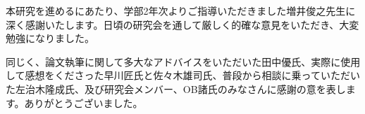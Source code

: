 \begin{acknowledgment}
  本研究を進めるにあたり、学部2年次よりご指導いただきました増井俊之先生に深く感謝いたします。日頃の研究会を通して厳しく的確な意見をいただき、大変勉強になりました。
  
  同じく、論文執筆に関して多大なアドバイスをいただいた田中優氏、実際に使用して感想をくださった早川匠氏と佐々木雄司氏、普段から相談に乗っていただいた左治木隆成氏、及び研究会メンバー、OB諸氏のみなさんに感謝の意を表します。ありがとうございました。
\end{acknowledgment}
